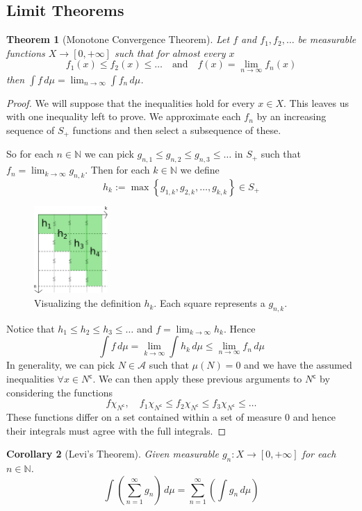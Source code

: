 \documentclass[11pt]{article}
\newcommand{\defeq}{:=}
\newcommand{\dm}{\ensuremath{\,d\mu}}
\newcommand{\stcmp}{^{\mathsf{c}}}
\newcommand{\N}{\mathbb{N}}
\newtheorem{theorem}{Theorem}[section]
\newtheorem{cor}[theorem]{Corollary}
\begin{document}
\subsection{Limit Theorems}
\begin{theorem}[Monotone Convergence Theorem]
Let $f$ and $f_1, f_2, \dots$ be measurable functions $X\to[0, +\infty]$ such that for almost every $x$
\[
	f_1(x)\leq f_2(x)\leq \dots \quad \text{and} \quad f(x)=\lim_{n\to\infty}f_n(x)
\]
then $\int f\dm = \lim_{n\to\infty}\int f_n \dm$.
\end{theorem}
\begin{proof}
We will suppose that the inequalities hold for every $x\in X$.
This leaves us with one inequality left to prove.
We approximate each $f_n$ by an increasing sequence of $S_+$ functions and then select a subsequence of these.

So for each $n\in\N$ we can pick $g_{n,1}\leq g_{n,2} \leq g_{n,3} \leq \dots$ in $S_+$ such that $f_n=\lim_{k\to\infty}g_{n,k}$.
Then for each $k\in\N$ we define
\[
	h_k\defeq\max\left\{g_{1,k},g_{2,k}, \dots , g_{k,k}\right\}\in S_+
\]
\begin{figure}[H]
	\centering
	\includegraphics[width=0.25\textwidth]{mct_diagram.png}	
	\caption{Visualizing the definition $h_k$. Each square represents a $g_{n,k}$.}
\end{figure}
Notice that $h_1\leq h_2 \leq h_3 \leq \dots$ and $f=\lim_{k\to\infty}h_k$.
Hence
\[
	\int f \dm = \lim_{k\to\infty}\int h_k \dm \leq \lim_{n\to\infty}f_n \dm
\]
In generality, we can pick $N\in\mathcal{A}$ such that $\mu(N)=0$ and we have the assumed inequalities $\forall x\in N\stcmp$.
We can then apply these previous arguments to $N\stcmp$ by considering the functions
\[
	f\chi_{N\stcmp}, \quad f_1\chi_{N\stcmp} \leq f_2\chi_{N\stcmp} \leq f_3\chi_{N\stcmp} \leq \dots
\]
These functions differ on a set contained within a set of measure 0 and hence their integrals must agree with the full integrals.
\end{proof}
\begin{cor}[Levi's Theorem]
	Given measurable $g_n: X\to[0, +\infty]$ for each $n\in\N$.
	\[
		\int\left( \sum_{n=1}^{\infty}g_n \right)\dm = \sum_{n=1}^{\infty}\left(\int g_n \dm\right)
	\]	
\end{cor}
\end{document}
